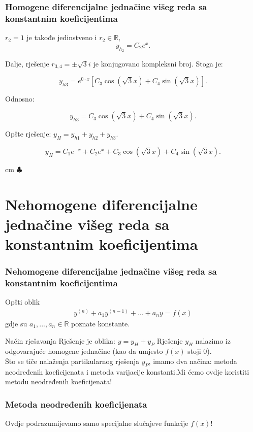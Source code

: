 \documentclass{beamer}
\begin{document}
 \begin{frame}
\frametitle{Homogene diferencijalne jednačine višeg reda sa konstantnim koeficijentima}
$r_{2} = 1 $  je takođe jedinstveno i $r_{2} \in \mathbb{R}, $
 $$y_{h_{2}} = C_{2}e^{x}.$$
 
 Dalje, rješenje $r_{3,4} = \pm \sqrt{3}i $ je konjugovano kompleksni broj. Stoga je:
 
 $$y_{h3} = e^{0 \cdot x}[C_{3} \cos{(\sqrt{3} x)} + C_{4} \sin{(\sqrt{3} x)}].$$
 
 Odnosno:
 
 $$y_{h3} = C_{3} \cos{(\sqrt{3} x)} + C_{4} \sin{(\sqrt{3} x)}.$$
 
Opšte rješenje: $ y_{H}= y_{h1} + y_{h2} + y_{h3}.  $

 $$y_{H} =  C_{1}e^{-x} +  C_{2}e^{x} + C_{3} \cos{(\sqrt{3} x)} + C_{4} \sin{(\sqrt{3} x)}.$$
 
  cm $\clubsuit$ \\
 

\end{frame}
\section{Nehomogene diferencijalne jednačine višeg reda sa konstantnim koeficijentima}



\begin{frame}
\frametitle{Nehomogene diferencijalne jednačine višeg reda sa konstantnim koeficijentima} 
\begin{alertblock}{Opšti oblik} \begin{eqnarray}
y^{(n)} + a_{1}y^{(n-1)}+ ... + a_{n}y = f(x)
\end{eqnarray}
gdje su $a_{1},...,a_{n} \in \mathbb{R}$ poznate konstante. \end{alertblock}
\begin{alertblock}{Način rješavanja}
Rješenje je oblika: $y= y_H + y_P$
Rješenje $y_H$ nalazimo iz odgovarajuće homogene jednačine (kao da umjesto $f(x)$ stoji 0).\\ Što se tiče nalaženja partikularnog rješenja $y_P$, imamo dva načina: metoda neodređenih koeficijenata i metoda varijacije konstanti.Mi ćemo ovdje koristiti metodu neodređenih koeficijenata! 
\subsubsection{Metoda neodređenih koeficijenata}
Ovdje podrazumijevamo samo specijalne slučajeve funkcije $f(x)!$
\end{alertblock}
\end{frame}
\end{document}
